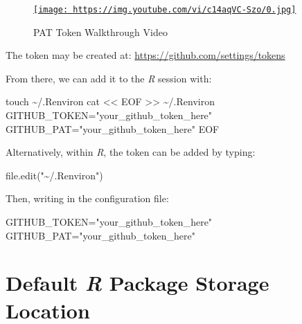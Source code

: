 \documentclass[
  letterpaper,
  DIV=11,
  numbers=noendperiod]{scrreport}
\newenvironment{Shaded}{\begin{snugshade}}{\end{snugshade}}
\newcommand{\FunctionTok}[1]{\textcolor[rgb]{0.28,0.35,0.67}{#1}}
\newcommand{\NormalTok}[1]{\textcolor[rgb]{0.00,0.23,0.31}{#1}}
\newcommand{\OperatorTok}[1]{\textcolor[rgb]{0.37,0.37,0.37}{#1}}
\newcommand{\StringTok}[1]{\textcolor[rgb]{0.13,0.47,0.30}{#1}}
\newcommand{\VariableTok}[1]{\textcolor[rgb]{0.07,0.07,0.07}{#1}}
\begin{document}
\begin{figure}

{\centering 

\href{https://www.youtube.com/watch?v=c14aqVC-Szo}{\texttt{[image: https://img.youtube.com/vi/c14aqVC-Szo/0.jpg]}}

}

\caption{PAT Token Walkthrough Video}

\end{figure}

The token may be created at: \url{https://github.com/settings/tokens}

From there, we can add it to the \emph{R} session with:

\begin{Shaded}
\begin{Highlighting}[]
\FunctionTok{touch}\NormalTok{ \textasciitilde{}/.Renviron}
\FunctionTok{cat} \OperatorTok{\textless{}\textless{} EOF} \OperatorTok{\textgreater{}\textgreater{}}\NormalTok{ \textasciitilde{}/.Renviron}
\StringTok{GITHUB\_TOKEN="your\_github\_token\_here"}
\StringTok{GITHUB\_PAT="your\_github\_token\_here"}
\OperatorTok{EOF}
\end{Highlighting}
\end{Shaded}

Alternatively, within \emph{R}, the token can be added by typing:

\begin{Shaded}
\begin{Highlighting}[]
\FunctionTok{file.edit}\NormalTok{(}\StringTok{"\textasciitilde{}/.Renviron"}\NormalTok{)}
\end{Highlighting}
\end{Shaded}

Then, writing in the configuration file:

\begin{Shaded}
\begin{Highlighting}[]
\VariableTok{GITHUB\_TOKEN}\OperatorTok{=}\StringTok{"your\_github\_token\_here"}
\VariableTok{GITHUB\_PAT}\OperatorTok{=}\StringTok{"your\_github\_token\_here"}
\end{Highlighting}
\end{Shaded}

\hypertarget{default-r-package-storage-location}{%
\section{\texorpdfstring{Default \emph{R} Package Storage
Location}{Default R Package Storage Location}}\label{default-r-package-storage-location}}
\end{document}
